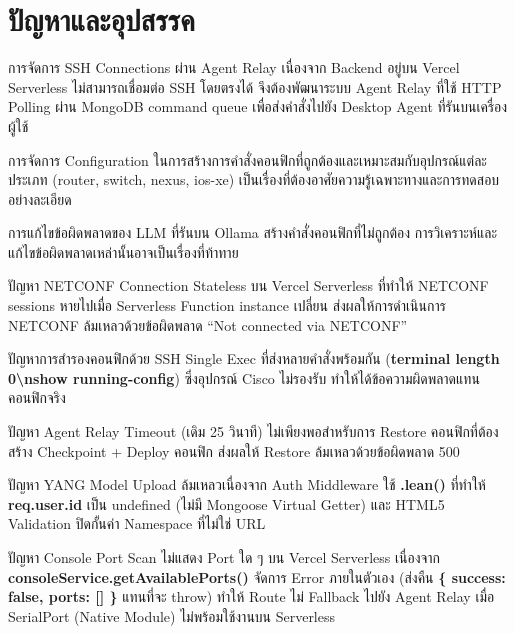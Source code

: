 \section{ปัญหาและอุปสรรค}
\begin{mycustomenum}[label=5.2.\arabic*] 
    \item การจัดการ SSH Connections ผ่าน Agent Relay เนื่องจาก Backend อยู่บน Vercel Serverless ไม่สามารถเชื่อมต่อ SSH โดยตรงได้ จึงต้องพัฒนาระบบ Agent Relay ที่ใช้ HTTP Polling ผ่าน MongoDB command queue เพื่อส่งคำสั่งไปยัง Desktop Agent ที่รันบนเครื่องผู้ใช้
    \item การจัดการ Configuration ในการสร้างการคำสั่งคอนฟิกที่ถูกต้องและเหมาะสมกับอุปกรณ์แต่ละประเภท (router, switch, nexus, ios-xe) เป็นเรื่องที่ต้องอาศัยความรู้เฉพาะทางและการทดสอบอย่างละเอียด
    \item การแก้ไขข้อผิดพลาดของ LLM ที่รันบน Ollama สร้างคำสั่งคอนฟิกที่ไม่ถูกต้อง การวิเคราะห์และแก้ไขข้อผิดพลาดเหล่านั้นอาจเป็นเรื่องที่ท้าทาย
    \item ปัญหา NETCONF Connection Stateless บน Vercel Serverless ที่ทำให้ NETCONF sessions หายไปเมื่อ Serverless Function instance เปลี่ยน ส่งผลให้การดำเนินการ NETCONF ล้มเหลวด้วยข้อผิดพลาด ``Not connected via NETCONF''
    \item ปัญหาการสำรองคอนฟิกด้วย SSH Single Exec ที่ส่งหลายคำสั่งพร้อมกัน (\textbf{terminal length 0\textbackslash nshow running-config}) ซึ่งอุปกรณ์ Cisco ไม่รองรับ ทำให้ได้ข้อความผิดพลาดแทนคอนฟิกจริง
    \item ปัญหา Agent Relay Timeout (เดิม 25 วินาที) ไม่เพียงพอสำหรับการ Restore คอนฟิกที่ต้องสร้าง Checkpoint + Deploy คอนฟิก ส่งผลให้ Restore ล้มเหลวด้วยข้อผิดพลาด 500
    \item ปัญหา YANG Model Upload ล้มเหลวเนื่องจาก Auth Middleware ใช้ \textbf{.lean()} ที่ทำให้ \textbf{req.user.id} เป็น undefined (ไม่มี Mongoose Virtual Getter) และ HTML5 Validation ปิดกั้นค่า Namespace ที่ไม่ใช่ URL
    \item ปัญหา Console Port Scan ไม่แสดง Port ใด ๆ บน Vercel Serverless เนื่องจาก \textbf{consoleService.getAvailablePorts()} จัดการ Error ภายในตัวเอง (ส่งคืน \textbf{\{ success: false, ports: [] \}} แทนที่จะ throw) ทำให้ Route ไม่ Fallback ไปยัง Agent Relay เมื่อ SerialPort (Native Module) ไม่พร้อมใช้งานบน Serverless
\end{mycustomenum}

